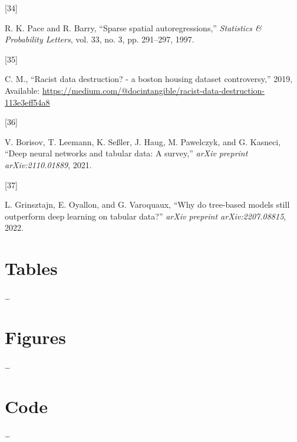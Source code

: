 \documentclass[
  conference]{IEEEtran}
\newlength{\cslhangindent}
\newlength{\csllabelwidth}
\newlength{\cslentryspacingunit} %
\newenvironment{CSLReferences}[2] %
 {%
  \setlength{\parindent}{0pt}
  \ifodd #1
  \let\oldpar\par
  \def\par{\hangindent=\cslhangindent\oldpar}
  \fi
  \setlength{\parskip}{#2\cslentryspacingunit}
 }%
 {}
\newcommand{\CSLLeftMargin}[1]{\parbox[t]{\csllabelwidth}{#1}}
\newcommand{\CSLRightInline}[1]{\parbox[t]{\linewidth - \csllabelwidth}{#1}\break}
\begin{document}
\begin{CSLReferences}{0}{0}
\leavevmode{}%
\CSLLeftMargin{{[}34{]} }%
\CSLRightInline{R. K. Pace and R. Barry, {``Sparse spatial
autoregressions,''} \emph{Statistics \& Probability Letters}, vol. 33,
no. 3, pp. 291--297, 1997.}

\leavevmode{}%
\CSLLeftMargin{{[}35{]} }%
\CSLRightInline{C. M., {``Racist data destruction? - a boston housing
dataset controversy,''} 2019, Available:
\url{https://medium.com/@docintangible/racist-data-destruction-113e3eff54a8}}

\leavevmode{}%
\CSLLeftMargin{{[}36{]} }%
\CSLRightInline{V. Borisov, T. Leemann, K. Seßler, J. Haug, M.
Pawelczyk, and G. Kasneci, {``Deep neural networks and tabular data: A
survey,''} \emph{arXiv preprint arXiv:2110.01889}, 2021.}

\leavevmode{}%
\CSLLeftMargin{{[}37{]} }%
\CSLRightInline{L. Grinsztajn, E. Oyallon, and G. Varoquaux, {``Why do
tree-based models still outperform deep learning on tabular data?''}
\emph{arXiv preprint arXiv:2207.08815}, 2022.}

\end{CSLReferences}

\pagebreak

\hypertarget{tables}{%
\section{Tables}\label{tables}}

\ldots{}

\pagebreak

\hypertarget{figures}{%
\section{Figures}\label{figures}}

\ldots{}

\pagebreak

\hypertarget{code}{%
\section{Code}\label{code}}

\ldots{}
\end{document}
